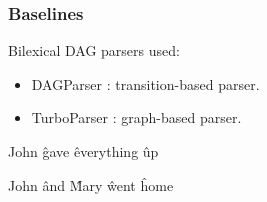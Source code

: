 \documentclass[t]{beamer}
\begin{document}
\begin{frame}
\frametitle{Baselines}
Bilexical DAG parsers used:
\begin{itemize}
 \item DAGParser \cite{ribeyre-villemontedelaclergerie-seddah:2014:SemEval}:
 transition-based parser.
 \item TurboParser \cite{almeida-martins:2015:SemEval}:
 graph-based parser.
\end{itemize}

\vfill
\pause
\begin{center}
	\begin{dependency}[theme = simple]
	\begin{deptext}[column sep=.7em,ampersand replacement=\^]
	John \^ gave \^ everything \^ up \\
	\end{deptext}
	\end{dependency}
	
	\begin{dependency}[theme = simple]
	\begin{deptext}[column sep=.7em,ampersand replacement=\^]
	John \^ and \^ Mary \^ went \^ home \\
	\end{deptext}
	\end{dependency}
\end{center}
\end{frame}
\end{document}
